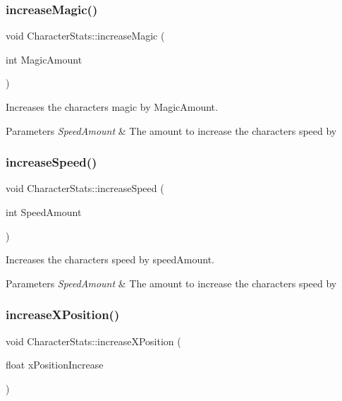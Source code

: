 \subsubsection{\texorpdfstring{increaseMagic()}{increaseMagic()}}
{\footnotesize\ttfamily void Character\+Stats\+::increase\+Magic (\begin{DoxyParamCaption}\item[{int}]{Magic\+Amount }\end{DoxyParamCaption})}



Increases the characters magic by Magic\+Amount. 


\begin{DoxyParams}{Parameters}
{\em Speed\+Amount} & The amount to increase the characters speed by \\
\hline
\end{DoxyParams}
\mbox{\label{classCharacterStats_ad79f2f74380b875d11849baf1d43eefc}} 
\subsubsection{\texorpdfstring{increaseSpeed()}{increaseSpeed()}}
{\footnotesize\ttfamily void Character\+Stats\+::increase\+Speed (\begin{DoxyParamCaption}\item[{int}]{Speed\+Amount }\end{DoxyParamCaption})}



Increases the characters speed by speed\+Amount. 


\begin{DoxyParams}{Parameters}
{\em Speed\+Amount} & The amount to increase the characters speed by \\
\hline
\end{DoxyParams}
\mbox{\label{classCharacterStats_a5f2fe8f102dbed7cfd5ec6960f2a3ca2}} 
\subsubsection{\texorpdfstring{increaseXPosition()}{increaseXPosition()}}
{\footnotesize\ttfamily void Character\+Stats\+::increase\+X\+Position (\begin{DoxyParamCaption}\item[{float}]{x\+Position\+Increase }\end{DoxyParamCaption})}



